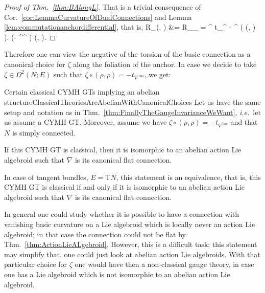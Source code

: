 \begin{proof}[Proof of Thm.~\ref{thm:BAlongL}]
\leavevmode\newline
That is a trivial consequence of Cor.~\ref{cor:LemmaCurvatureOfDualConnections} and Lemma \ref{lem:commutationanchordifferential}, that is,
\bas
R_\nabla \circ (\rho, \rho)
&=
R_{\nabla_\rho}
=
\nabla^{} t_{\nabla^{}}
- \nabla^{} \bigl( \zeta \circ (\rho, \rho) \bigr).
\left(- ^{\nabla^{}} \zeta\right) \circ (\rho, \rho).
\eas
\end{proof}

Therefore one can view the negative of the torsion of the basic connection as a canonical choice for $\zeta$ along the foliation of the anchor. 
In case we decide to take $\zeta \in \Omega^2(N;E)$ such that $\zeta \circ (\rho, \rho) = - t_{\nabla^{\mathrm{bas}}}$, we get:

\begin{corollaries}{Certain classical CYMH GTs implying an abelian structure}{ClassicalTheoriesAreAbelianWithCanonicalChoices}
Let us have the same setup and notation as in Thm.~\ref{thm:FinallyTheGaugeInvarianceWeWant}, \textit{i.e.}~let us assume a CYMH GT. Moreover, assume we have $\zeta \circ (\rho, \rho) = - t_{\nabla^{\mathrm{bas}}}$ and that $N$ is simply connected.

If this CYMH GT is classical, then it is isomorphic to an abelian action Lie algebroid such that $\nabla$ is its canonical flat connection.

In case of tangent bundles, $E = \mathrm{T}N$, this statement is an equivalence, that is, this CYMH GT is classical if and only if it is isomorphic to an abelian action Lie algebroid such that $\nabla$ is its canonical flat connection.
\end{corollaries}

\begin{remark}
\leavevmode\newline
In general one could study whether it is possible to have a connection with vanishing basic curvature on a Lie algebroid which is locally never an action Lie algebroid; in that case the connection could not be flat by Thm.~\ref{thm:ActionLieALgebroid}. However, this is a difficult task; this statement may simplify that, one could just look at abelian action Lie algebroids. With that particular choice for $\zeta$ one would have then a non-classical gauge theory, in case one has a Lie algebroid which is not isomorphic to an abelian action Lie algebroid.
\end{remark}

